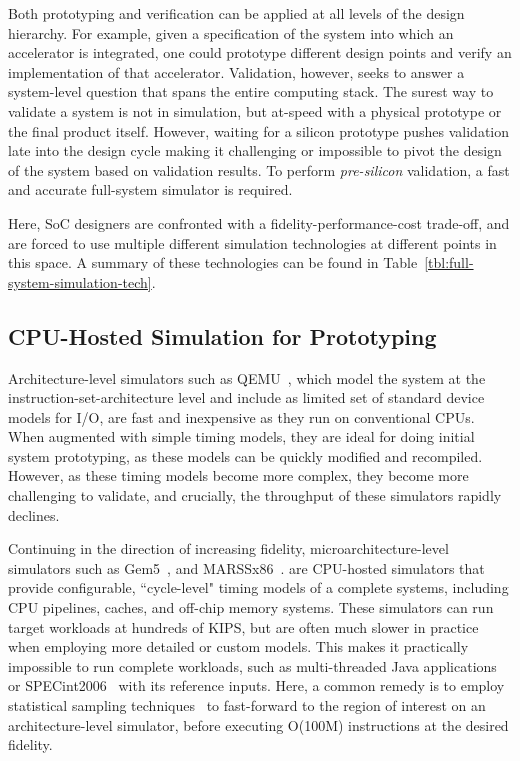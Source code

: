Both prototyping and verification can be applied at all levels of the design
hierarchy.  For example, given a specification of the system into which an
accelerator is integrated, one could prototype different design points and
verify an implementation of that accelerator. Validation, however, seeks to
answer a system-level question that spans the entire computing stack.  The
surest way to validate a system is not in simulation, but at-speed with a
physical prototype or the final product itself. However, waiting for a silicon
prototype pushes validation late into the design cycle making it challenging or
impossible to pivot the design of the system based on validation results. To
perform \emph{pre-silicon} validation, a fast and accurate full-system
simulator is required.

Here, SoC designers are confronted with a fidelity-performance-cost trade-off,
and are forced to use multiple different simulation technologies at different
points in this space. A summary of these technologies can be found in
Table~\ref{tbl:full-system-simulation-tech}.

\subsection{CPU-Hosted Simulation for Prototyping}\label{UArchSWSim}

Architecture-level simulators such as QEMU~\cite{QEMU}, which model the system at the
instruction-set-architecture level and include as limited set of standard
device models for I/O, are fast and inexpensive as they run on conventional CPUs.
When augmented with simple timing models, they are ideal for doing initial system prototyping, as
these models can be quickly modified and recompiled.
However, as these timing models become more complex, they become more
challenging to validate, and crucially, the throughput of these simulators rapidly declines.

Continuing in the direction of increasing fidelity, microarchitecture-level
simulators such as Gem5~\cite{Gem5}, and MARSSx86~\cite{MARSSx86}. are CPU-hosted 
simulators that provide configurable, ``cycle-level" timing models of a complete systems, including CPU pipelines,
caches, and off-chip memory systems.  These simulators can run target workloads at hundreds of KIPS, but are
often much slower in practice when employing more detailed or custom models. This
makes it practically impossible to run complete workloads, such as
multi-threaded Java applications or SPECint2006~\cite{SPEC2006} with its reference
inputs. Here, a common remedy is to employ statistical sampling
techniques~\cite{smarts} to fast-forward to the region of interest on an architecture-level simulator, before
executing O(100M) instructions at the desired fidelity.

